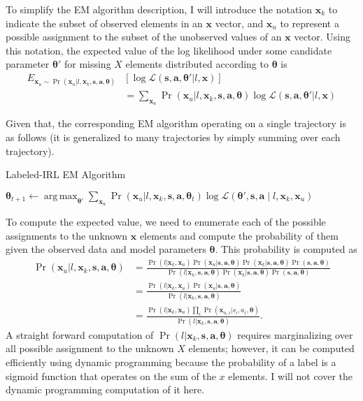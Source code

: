 \documentclass{article}
\DeclareMathOperator*{\argmax}{arg\,max}
\begin{document}
To simplify the EM algorithm description, I will introduce the notation $\bm{x}_k$ to indicate the subset of observed elements in an $\bm{x}$ vector, and $\bm{x}_u$ to represent a possible assignment to the subset of the unobserved values of an $\bm{x}$ vector. Using this notation, the expected value of the log likelihood under some candidate parameter $\bm{\theta}'$ for missing $X$ elements distributed according to $\bm{\theta}$ is
\begin{align*}
E_{\bm{x}_u \sim \Pr(\bm{x}_u | l, \bm{x}_k, \bm{s}, \bm{a}, \bm{\theta})} & \left[ \log\mathcal{L}(\bm{s}, \bm{a}, \bm{\theta}' | l, \bm{x}) \right] \\ &= \sum_{\bm{x}_u} \Pr(\bm{x}_u | l, \bm{x}_k, \bm{s}, \bm{a}, \bm{\theta}) \log\mathcal{L}(\bm{s}, \bm{a}, \bm{\theta}' | l, \bm{x})
\end{align*}


Given that, the corresponding EM algorithm operating on a single trajectory is as follows (it is generalized to many trajectories by simply summing over each trajectory).
\begin{algorithm}
\caption{Labeled-IRL EM Algorithm}
\begin{algorithmic}
\State $\bm{\theta}_{t+1} \gets \argmax_{\bm{\theta'}} \sum_{\bm{x}_u} \Pr(\bm{x}_u | l, \bm{x}_k, \bm{s}, \bm{a}, \bm{\theta}_t) \log\mathcal{L}(\bm{\theta'}, \bm{s}, \bm{a} \mid l, \bm{x}_k, \bm{x}_u)$
\EndFor
\end{algorithmic}
\end{algorithm}

To compute the expected value, we need to enumerate each of the possible assignments to the unknown $\bm{x}$ elements and compute the probability of them given the observed data and model parameters $\bm{\theta}$.  This probability is computed as
\begin{align*}
\Pr(\bm{x}_u | l, \bm{x}_k, \bm{s}, \bm{a}, \bm{\theta}) &= \frac{\Pr(l | \bm{x}_k, \bm{x}_u) \Pr(\bm{x}_u | \bm{s}, \bm{a}, \bm{\theta}) \Pr(\bm{x}_k | \bm{s}, \bm{a}, \bm{\theta}) \Pr(\bm{s}, \bm{a}, \bm{\theta})}{\Pr(l | \bm{x}_k, \bm{s}, \bm{a}, \bm{\theta}) \Pr(\bm{x}_k | \bm{s}, \bm{a}, \bm{\theta}) \Pr(\bm{s}, \bm{a}, \bm{\theta})} \\
 &= \frac{\Pr(l | \bm{x}_k, \bm{x}_u) \Pr(\bm{x}_u | \bm{s}, \bm{a}, \bm{\theta}) }{\Pr(l | \bm{x}_k, \bm{s}, \bm{a}, \bm{\theta})} \\
 &= \frac{\Pr(l | \bm{x}_k, \bm{x}_u) \prod_i \Pr(\bm{x}_{u,i} | s_i, a_i, \bm{\theta}) }{\Pr(l | \bm{x}_k, \bm{s}, \bm{a}, \bm{\theta})}. 
\end{align*}
A straight forward computation of $\Pr(l | \bm{x}_k, \bm{s}, \bm{a}, \bm{\theta})$ requires marginalizing over all possible assignment to the unknown $X$ elements; however, it can be computed efficiently using dynamic programming because the probability of a label is a sigmoid function that operates on the sum of the $x$ elements. I will not cover the dynamic programming computation of it here.
\end{document}
